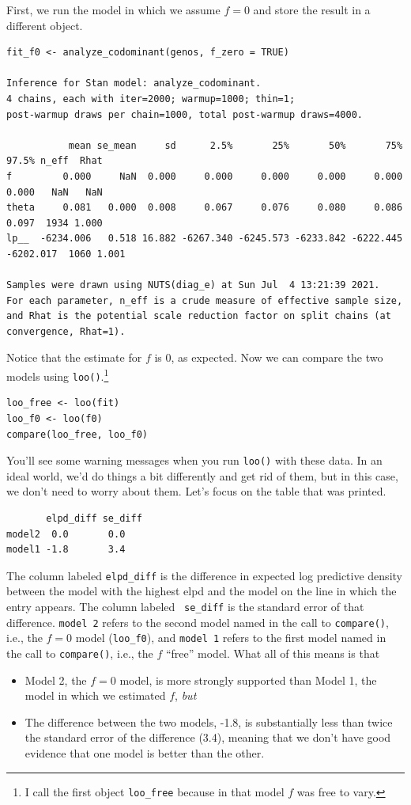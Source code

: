 \documentclass[12pt]{article}
\begin{document}
First, we run the model in which we assume $f = 0$ and store the
result in a different object.
\begin{verbatim}
fit_f0 <- analyze_codominant(genos, f_zero = TRUE)

Inference for Stan model: analyze_codominant.
4 chains, each with iter=2000; warmup=1000; thin=1; 
post-warmup draws per chain=1000, total post-warmup draws=4000.

           mean se_mean     sd      2.5%       25%       50%       75%     97.5% n_eff  Rhat
f         0.000     NaN  0.000     0.000     0.000     0.000     0.000     0.000   NaN   NaN
theta     0.081   0.000  0.008     0.067     0.076     0.080     0.086     0.097  1934 1.000
lp__  -6234.006   0.518 16.882 -6267.340 -6245.573 -6233.842 -6222.445 -6202.017  1060 1.001

Samples were drawn using NUTS(diag_e) at Sun Jul  4 13:21:39 2021.
For each parameter, n_eff is a crude measure of effective sample size,
and Rhat is the potential scale reduction factor on split chains (at 
convergence, Rhat=1).
\end{verbatim}
Notice that the estimate for $f$ is 0, as expected. Now we can
compare the two models using {\tt loo()}.\footnote{I call the first
  object {\tt loo\_free} because in that model $f$ was free to vary.}
\begin{verbatim}
loo_free <- loo(fit)
loo_f0 <- loo(f0)
compare(loo_free, loo_f0)
\end{verbatim}
You'll see some warning messages when you run {\tt loo()} with these
data. In an ideal world, we'd do things a bit differently and get rid
of them, but in this case, we don't need to worry about them. Let's
focus on the table that was printed.
\begin{verbatim}
       elpd_diff se_diff
model2  0.0       0.0   
model1 -1.8       3.4   
\end{verbatim}
The column labeled {\tt elpd\_diff} is the difference in expected log
predictive density between the model with the highest elpd and the
model on the line in which the entry appears. The column labeled {\tt
  se\_diff} is the standard error of that difference. {\tt model 2}
refers to the second model named in the call to {\tt compare()}, i.e.,
the $f=0$ model ({\tt loo\_f0}), and {\tt model 1} refers to the first
model named in the call to {\tt compare()}, i.e., the $f$ ``free''
model. What all of this means is that

\begin{itemize}

  \item Model 2, the $f=0$ model, is more strongly supported than
    Model 1, the model in which we estimated $f$, {\it but}

  \item The difference between the two models, -1.8, is substantially
    less than twice the standard error of the difference (3.4),
    meaning that we don't have good evidence that one model is better
    than the other.
    
\end{itemize}
\end{document}

